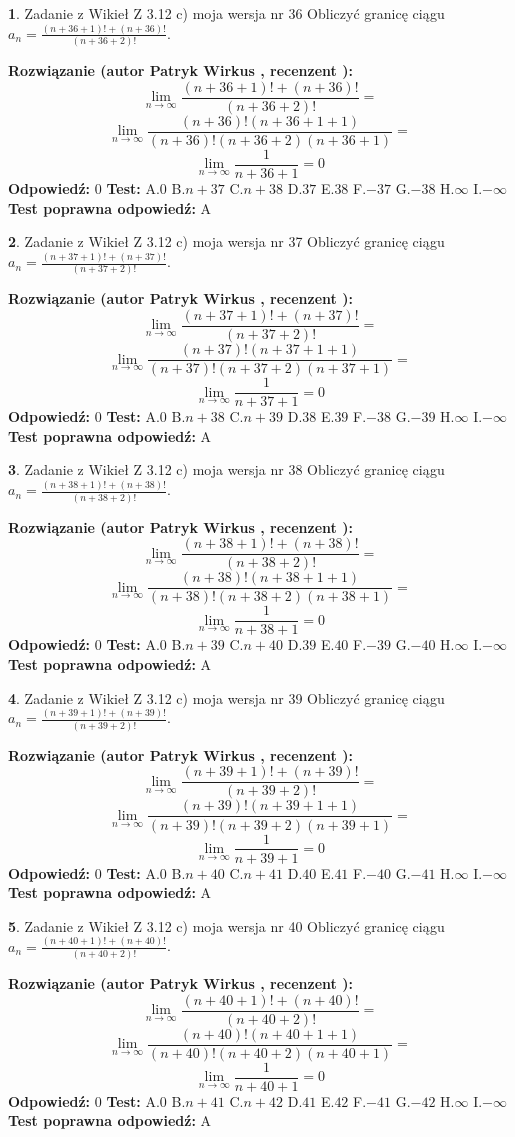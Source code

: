 \documentclass[12pt, a4paper]{article}
\theoremstyle{definition} %
\newtheorem{zad}{}
\newcommand{\zadStart}[1]{\begin{zad}#1\newline}
\newcommand{\zadStop}{\end{zad}}
\newcommand{\rozwStart}[2]{\noindent \textbf{Rozwiązanie (autor #1 , recenzent #2): }\newline}
\newcommand{\rozwStop}{\newline}
\newcommand{\odpStart}{\noindent \textbf{Odpowiedź:}\newline}
\newcommand{\odpStop}{\newline}
\newcommand{\testStart}{\noindent \textbf{Test:}\newline}
\newcommand{\testStop}{\newline}
\newcommand{\kluczStart}{\noindent \textbf{Test poprawna odpowiedź:}\newline}
\newcommand{\kluczStop}{\newline}
\begin{document}
\zadStart{Zadanie z Wikieł Z 3.12 c) moja wersja nr 36}
Obliczyć granicę ciągu $a_{n}=\frac{(n+36+1)!+(n+36)!}{(n+36+2)!}$.
\zadStop
\rozwStart{Patryk Wirkus}{}
$$\lim\limits_{n\to\infty}\frac{(n+36+1)!+(n+36)!}{(n+36+2)!}=$$
$$\lim\limits_{n\to\infty}\frac{(n+36)!(n+36+1+1)}{(n+36)!(n+36+2)(n+36+1)}=$$
$$\lim\limits_{n\to\infty}\frac{1}{n+36+1}= 0$$
\rozwStop
\odpStart
$0$
\odpStop
\testStart
A.$0$
B.$n+37$
C.$n+38$
D.$37$
E.$38$
F.$-37$
G.$-38$
H.$\infty$
I.$-\infty$
\testStop
\kluczStart
A
\kluczStop



\zadStart{Zadanie z Wikieł Z 3.12 c) moja wersja nr 37}
Obliczyć granicę ciągu $a_{n}=\frac{(n+37+1)!+(n+37)!}{(n+37+2)!}$.
\zadStop
\rozwStart{Patryk Wirkus}{}
$$\lim\limits_{n\to\infty}\frac{(n+37+1)!+(n+37)!}{(n+37+2)!}=$$
$$\lim\limits_{n\to\infty}\frac{(n+37)!(n+37+1+1)}{(n+37)!(n+37+2)(n+37+1)}=$$
$$\lim\limits_{n\to\infty}\frac{1}{n+37+1}= 0$$
\rozwStop
\odpStart
$0$
\odpStop
\testStart
A.$0$
B.$n+38$
C.$n+39$
D.$38$
E.$39$
F.$-38$
G.$-39$
H.$\infty$
I.$-\infty$
\testStop
\kluczStart
A
\kluczStop



\zadStart{Zadanie z Wikieł Z 3.12 c) moja wersja nr 38}
Obliczyć granicę ciągu $a_{n}=\frac{(n+38+1)!+(n+38)!}{(n+38+2)!}$.
\zadStop
\rozwStart{Patryk Wirkus}{}
$$\lim\limits_{n\to\infty}\frac{(n+38+1)!+(n+38)!}{(n+38+2)!}=$$
$$\lim\limits_{n\to\infty}\frac{(n+38)!(n+38+1+1)}{(n+38)!(n+38+2)(n+38+1)}=$$
$$\lim\limits_{n\to\infty}\frac{1}{n+38+1}= 0$$
\rozwStop
\odpStart
$0$
\odpStop
\testStart
A.$0$
B.$n+39$
C.$n+40$
D.$39$
E.$40$
F.$-39$
G.$-40$
H.$\infty$
I.$-\infty$
\testStop
\kluczStart
A
\kluczStop



\zadStart{Zadanie z Wikieł Z 3.12 c) moja wersja nr 39}
Obliczyć granicę ciągu $a_{n}=\frac{(n+39+1)!+(n+39)!}{(n+39+2)!}$.
\zadStop
\rozwStart{Patryk Wirkus}{}
$$\lim\limits_{n\to\infty}\frac{(n+39+1)!+(n+39)!}{(n+39+2)!}=$$
$$\lim\limits_{n\to\infty}\frac{(n+39)!(n+39+1+1)}{(n+39)!(n+39+2)(n+39+1)}=$$
$$\lim\limits_{n\to\infty}\frac{1}{n+39+1}= 0$$
\rozwStop
\odpStart
$0$
\odpStop
\testStart
A.$0$
B.$n+40$
C.$n+41$
D.$40$
E.$41$
F.$-40$
G.$-41$
H.$\infty$
I.$-\infty$
\testStop
\kluczStart
A
\kluczStop



\zadStart{Zadanie z Wikieł Z 3.12 c) moja wersja nr 40}
Obliczyć granicę ciągu $a_{n}=\frac{(n+40+1)!+(n+40)!}{(n+40+2)!}$.
\zadStop
\rozwStart{Patryk Wirkus}{}
$$\lim\limits_{n\to\infty}\frac{(n+40+1)!+(n+40)!}{(n+40+2)!}=$$
$$\lim\limits_{n\to\infty}\frac{(n+40)!(n+40+1+1)}{(n+40)!(n+40+2)(n+40+1)}=$$
$$\lim\limits_{n\to\infty}\frac{1}{n+40+1}= 0$$
\rozwStop
\odpStart
$0$
\odpStop
\testStart
A.$0$
B.$n+41$
C.$n+42$
D.$41$
E.$42$
F.$-41$
G.$-42$
H.$\infty$
I.$-\infty$
\testStop
\kluczStart
A
\kluczStop
\end{document}
